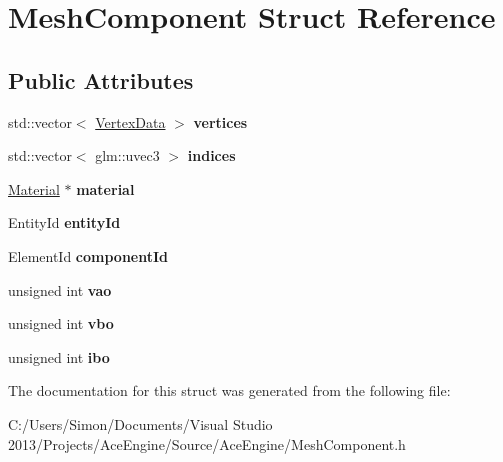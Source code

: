 \hypertarget{struct_mesh_component}{}\section{Mesh\+Component Struct Reference}
\label{struct_mesh_component}
\subsection*{Public Attributes}
\begin{DoxyCompactItemize}
\item 
\hypertarget{struct_mesh_component_a5dabe09145b3ba3d0bf35201c59b7d49}{}std\+::vector$<$ \hyperlink{struct_vertex_data}{Vertex\+Data} $>$ {\bfseries vertices}\label{struct_mesh_component_a5dabe09145b3ba3d0bf35201c59b7d49}

\item 
\hypertarget{struct_mesh_component_a0ef7d5fb48b0a8d4e7c889b9206d68df}{}std\+::vector$<$ glm\+::uvec3 $>$ {\bfseries indices}\label{struct_mesh_component_a0ef7d5fb48b0a8d4e7c889b9206d68df}

\item 
\hypertarget{struct_mesh_component_a5f607c9d313bb473f01ac86082c9b617}{}\hyperlink{struct_material}{Material} $\ast$ {\bfseries material}\label{struct_mesh_component_a5f607c9d313bb473f01ac86082c9b617}

\item 
\hypertarget{struct_mesh_component_a9881fc4e46f9cad6d229e3643e54b1e2}{}Entity\+Id {\bfseries entity\+Id}\label{struct_mesh_component_a9881fc4e46f9cad6d229e3643e54b1e2}

\item 
\hypertarget{struct_mesh_component_a56b12f9756667a7719ac62f937c57fd7}{}Element\+Id {\bfseries component\+Id}\label{struct_mesh_component_a56b12f9756667a7719ac62f937c57fd7}

\item 
\hypertarget{struct_mesh_component_ac419628879840f6d0560062bf4182793}{}unsigned int {\bfseries vao}\label{struct_mesh_component_ac419628879840f6d0560062bf4182793}

\item 
\hypertarget{struct_mesh_component_ad85ab98abf37fcdf4b2af749cad56d76}{}unsigned int {\bfseries vbo}\label{struct_mesh_component_ad85ab98abf37fcdf4b2af749cad56d76}

\item 
\hypertarget{struct_mesh_component_a9a2360bb917135b848f959012a8d2015}{}unsigned int {\bfseries ibo}\label{struct_mesh_component_a9a2360bb917135b848f959012a8d2015}

\end{DoxyCompactItemize}


The documentation for this struct was generated from the following file\+:\begin{DoxyCompactItemize}
\item 
C\+:/\+Users/\+Simon/\+Documents/\+Visual Studio 2013/\+Projects/\+Ace\+Engine/\+Source/\+Ace\+Engine/Mesh\+Component.\+h\end{DoxyCompactItemize}
